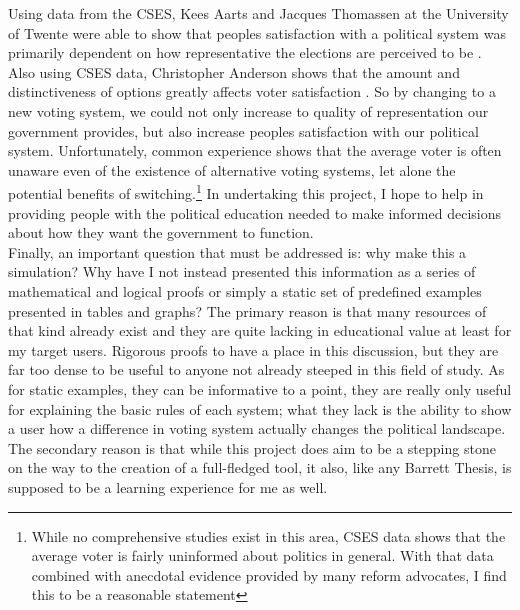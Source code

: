 \documentclass[12pt]{article}
\newcounter{step}
\begin{document}
\qquad Using data from the CSES, Kees Aarts and Jacques Thomassen at the University of Twente were able to show that peoples satisfaction with a political system was primarily dependent on how representative the elections are perceived to be \parencite{aarts}. Also using CSES data, Christopher Anderson shows that the amount and distinctiveness of options greatly affects voter satisfaction \parencite{anderson}. So by changing to a new voting system, we could not only increase to quality of representation our government provides, but also increase peoples satisfaction with our political system. Unfortunately, common experience shows that the average voter is often unaware even of the existence of alternative voting systems, let alone the potential benefits of switching.\footnote{While no comprehensive studies exist in this area, CSES data shows that the average voter is fairly uninformed about politics in general. With that data combined with anecdotal evidence provided by many reform advocates, I find this to be a reasonable statement} In undertaking this project, I hope to help in providing people with the political education needed to make informed decisions about how they want the government to function. \\

\qquad Finally, an important question that must be addressed is: why make this a simulation? Why have I not instead presented this information as a series of mathematical and logical proofs or simply a static set of predefined examples presented in tables and graphs? The primary reason is that many resources of that kind already exist and they are quite lacking in educational value at least for my target users. Rigorous proofs to have a place in this discussion, but they are far too dense to be useful to anyone not already steeped in this field of study. As for static examples, they can be informative to a point, they are really only useful for explaining the basic rules of each system; what they lack is the ability to show a user how a difference in voting system actually changes the political landscape. The secondary reason is that while this project does aim to be a stepping stone on the way to the creation of a full-fledged tool, it also, like any Barrett Thesis, is supposed to be a learning experience for me as well. \\

\end{document}
